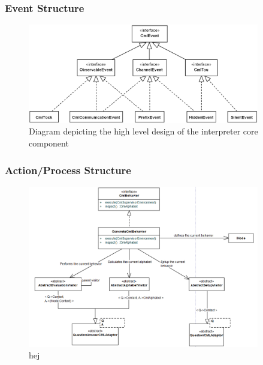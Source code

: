 \documentclass[a4paper, 12pt]{include/compassreport}   %
\begin{document}
\subsubsection{Event Structure}
\label{sec:event_structure}

\begin{figure}[ht!]
  \begin{center}
    \includegraphics[width=0.9\textwidth]{figures/Events}
    \caption{Diagram depicting the high level design of the interpreter core component}
    \label{fig:events}
  \end{center}
\end{figure}


\subsubsection{Action/Process Structure}
\label{sec:action_process_structure}

\begin{figure}[ht!]
  \begin{center}
    \includegraphics[width=0.9\textwidth]{figures/CmlBehaviors}
    \caption{hej}
    \label{fig:cmlbehaviors}
  \end{center}
\end{figure}
\end{document}
